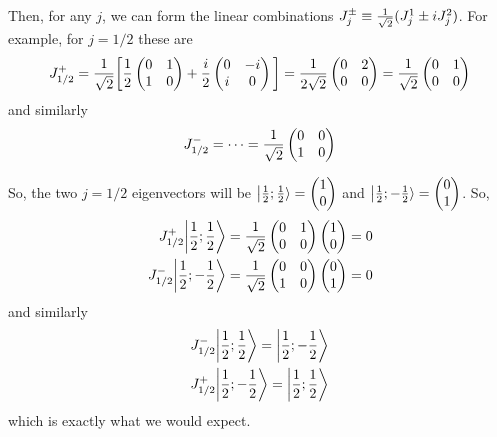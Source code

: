 \documentclass[12pt,epsf]{article}
\def\nolabel{\nonumber }
\def\nolabel{\nonumber }
\begin{document}
Then, for any $j$, we can form the linear combinations $J^{\pm}_j
\equiv {1\over \sqrt{2}}(J^1_j \pm i J^2_j)$.  For example, for $j=1/2$
these are
\begin{eqnarray}
J^+_{1/2} = {1\over \sqrt{2}} \bigg[{1\over 2}
\begin{pmatrix}
0 & 1 \\ 1 & 0
\end{pmatrix} + {i \over 2}
\begin{pmatrix}
0 & -i \\ i & 0
\end{pmatrix}\bigg] = {1\over 2\sqrt{2}}
\begin{pmatrix}
0 & 2 \\ 0 & 0
\end{pmatrix} = {1\over \sqrt{2}}
\begin{pmatrix}
0 & 1 \\ 0 & 0 
\end{pmatrix}\nolabel
\end{eqnarray}
and similarly
\begin{eqnarray}
J^-_{1/2} = \cdots = {1\over \sqrt{2}}
\begin{pmatrix}
0 & 0 \\ 1 & 0
\end{pmatrix}\nolabel
\end{eqnarray}

So, the two $j=1/2$ eigenvectors will be $\big|{1\over 2};{1\over
2}\rangle = \begin{pmatrix} 1 \\ 0 \end{pmatrix}$ and $\big|{1\over
2};-{1\over 2}\rangle = \begin{pmatrix} 0 \\ 1 \end{pmatrix}$.	So, 
\begin{eqnarray}
J^+_{1/2}\bigg|{1\over 2};{1\over 2}\bigg\rangle = {1\over \sqrt{2}} 
\begin{pmatrix}
0 & 1 \\ 0 & 0
\end{pmatrix}
\begin{pmatrix}
1 \\ 0
\end{pmatrix} = 0 \nolabel\\
J^-_{1/2}\bigg|{1\over 2};-{1\over 2}\bigg\rangle = {1\over \sqrt{2}}
\begin{pmatrix}
0 & 0 \\ 1& 0
\end{pmatrix}
\begin{pmatrix}
0 \\ 1
\end{pmatrix} = 0 \nolabel
\end{eqnarray}
and similarly
\begin{eqnarray} 
J^-_{1/2}\bigg|{1\over 2};{1\over 2}\bigg\rangle = \bigg|{1\over
2};-{1\over 2}\bigg\rangle \nolabel\\
J^+_{1/2}\bigg|{1\over 2};-{1\over 2}\bigg\rangle = \bigg|{1\over
2};{1\over 2}\bigg\rangle \nolabel
\end{eqnarray}
which is exactly what we would expect.	
\end{document}
